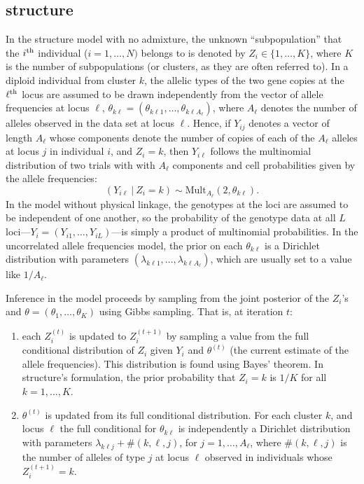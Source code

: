 \subsection*{{\sc structure}}
In the {\sc structure} model with no admixture, the unknown ``subpopulation'' that the 
$i^\mathrm{th}$ individual ($i=1,\ldots,N)$ belongs to is denoted by $Z_i \in \{1,\ldots,K\}$, where $K$ is the 
number of subpopulations (or clusters, as they are often referred to).  
In a diploid individual from cluster $k$, the 
allelic types of the two gene copies at the $\ell^\mathrm{th}$ locus are assumed
to be drawn independently from the vector of allele frequencies at
locus $\ell$,  $\theta_{k\ell}=(\theta_{k\ell 1},\ldots,\theta_{k\ell A_\ell})$, where $A_\ell$ 
denotes the number of alleles observed in the data set at locus $\ell$.
Hence, if $Y_{ij}$ denotes a vector of length $A_\ell$ whose components denote the number
of copies of each of the $A_\ell$ alleles at locus $j$ in individual $i$, and 
$Z_i=k$, then $Y_{i\ell}$ follows the multinomial distribution of two trials with
with $A_\ell$  components and cell probabilities given by the allele frequencies: 
\begin{equation}
(Y_{i\ell}~|~Z_i=k) \sim \mathrm{Mult}_{A_\ell}(2, \theta_{k\ell}).
\end{equation}
In the model without physical linkage, the genotypes at the loci are assumed to
be independent of one another, so the probability of the genotype data at
all $L$ loci---$Y_i=(Y_{i1},\ldots,Y_{iL})$---is simply a product of multinomial probabilities.
In the uncorrelated allele frequencies model, the prior on each $\theta_{k\ell}$ is a
Dirichlet distribution with parameters $(\lambda_{k\ell1},\ldots,\lambda_{k\ell A_\ell})$,
which are usually set to a value like $1/A_\ell$.  

Inference in the model proceeds by sampling from the joint posterior of the 
$Z_i$'s and $\theta = (\theta_1,\ldots,\theta_K)$ using Gibbs sampling.  That is,
at iteration $t$:
\begin{enumerate}
\item each $Z^{(t)}_i$ is updated to $Z^{(t+1)}_i$ by sampling a value from 
the full conditional distribution of $Z_i$ given
$Y_i$ and $\theta^{(t)}$ (the current estimate of the allele frequencies).  This
distribution is found using Bayes' theorem. In {\sc structure}'s formulation, the 
prior probability that $Z_i=k$ is $1/K$ for all $k=1,\ldots, K$.     
\item $\theta^{(t)}$ is updated from its full conditional distribution.  For each cluster
$k$, and locus $\ell$ the full conditional for $\theta_{k\ell}$ is independently a 
Dirichlet distribution with parameters $\lambda_{k\ell j} + \#(k,\ell,j)$, for $j=1,\ldots, A_\ell$,
where $\#(k,\ell,j)$ is the number of alleles of type $j$ at locus $\ell$ observed in 
individuals whose $Z^{(t+1)}_i = k$.   
\end{enumerate}

